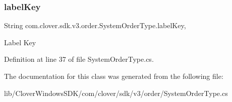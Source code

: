 \mbox{\label{classcom_1_1clover_1_1sdk_1_1v3_1_1order_1_1_system_order_type_ac7e629fc4063269c972820acdda63448}} 
\subsubsection{\texorpdfstring{label\+Key}{labelKey}}
{\footnotesize\ttfamily String com.\+clover.\+sdk.\+v3.\+order.\+System\+Order\+Type.\+label\+Key\hspace{0.3cm}{\ttfamily [get]}, {\ttfamily [set]}}



Label Key 



Definition at line 37 of file System\+Order\+Type.\+cs.



The documentation for this class was generated from the following file\+:\begin{DoxyCompactItemize}
\item 
lib/\+Clover\+Windows\+S\+D\+K/com/clover/sdk/v3/order/System\+Order\+Type.\+cs\end{DoxyCompactItemize}
